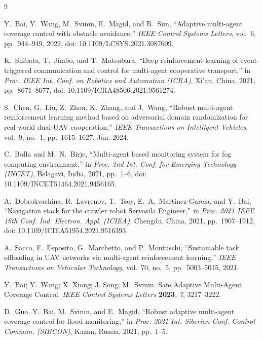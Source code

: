 \documentclass[fleqn,10pt,twocolumn]{main}
\begin{document}
\begin{thebibliography}{9}

Y.~Bai, Y.~Wang, M.~Svinin, E.~Magid, and R.~Sun, ``Adaptive multi-agent coverage control with obstacle avoidance,'' \emph{IEEE Control Systems Letters}, vol.~6, pp.~944--949, 2022, doi: 10.1109/LCSYS.2021.3087609.

K.~Shibata, T.~Jimbo, and T.~Matsubara, ``Deep reinforcement learning of event-triggered communication and control for multi-agent cooperative transport,'' in \emph{Proc. IEEE Int. Conf. on Robotics and Automation (ICRA)}, Xi'an, China, 2021, pp.~8671--8677, doi: 10.1109/ICRA48506.2021.9561274.

S.~Chen, G.~Liu, Z.~Zhou, K.~Zhang, and J.~Wang, ``Robust multi-agent reinforcement learning method based on adversarial domain randomization for real-world dual-UAV cooperation,'' \emph{IEEE Transactions on Intelligent Vehicles}, vol.~9, no.~1, pp.~1615--1627, Jan. 2024.

C.~Bulla and M.~N.~Birje, ``Multi-agent based monitoring system for fog computing environment,'' in \emph{Proc. 2nd Int. Conf. for Emerging Technology (INCET)}, Belagavi, India, 2021, pp.~1--6, doi: 10.1109/INCET51464.2021.9456165.

A.~Dobrokvashina, R.~Lavrenov, T.~Tsoy, E.~A.~Martinez-Garcia, and Y.~Bai, 
``Navigation stack for the crawler robot Servosila Engineer,'' 
in \emph{Proc. 2021 IEEE 16th Conf. Ind. Electron. Appl. (ICIEA)}, Chengdu, China, 2021, pp.~1907--1912, 
doi: 10.1109/ICIEA51954.2021.9516393.

A.~Sacco, F.~Esposito, G.~Marchetto, and P.~Montuschi, ``Sustainable task offloading in UAV networks via multi-agent reinforcement learning,'' \emph{IEEE Transactions on Vehicular Technology}, vol.~70, no.~5, pp.~5003--5015, 2021.

Y.~Bai; Y.~Wang; X. Xiong; J. Song;  M.~Svinin. Safe Adaptive Multi-Agent Coverage Control. 
\textit{IEEE Control Systems Letters} \textbf{2023}, \textit{7}, 3217--3222.

D.~Guo, Y.~Bai, M.~Svinin, and E.~Magid, ``Robust adaptive multi-agent coverage control for flood monitoring,'' in \emph{Proc. 2021 Int. Siberian Conf. Control Commun. (SIBCON)}, Kazan, Russia, 2021, pp.~1--5.


\end{thebibliography}
\end{document}
